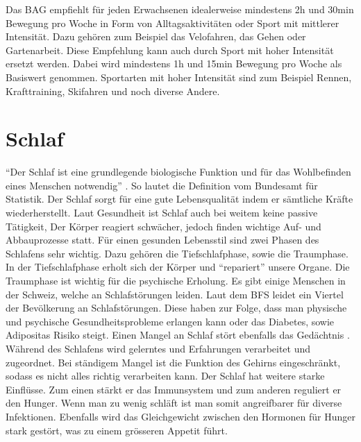 \newline
Das BAG empfiehlt für jeden Erwachsenen idealerweise mindestens 2h und 30min Bewegung pro Woche in Form von Alltagsaktivitäten oder Sport mit mittlerer Intensität.\cite{bewegungsfoerderung} Dazu gehören zum Beispiel das Velofahren, das Gehen oder Gartenarbeit. Diese Empfehlung kann auch durch Sport mit hoher Intensität ersetzt werden. Dabei wird mindestens 1h und 15min Bewegung pro Woche als Basiswert genommen. Sportarten mit hoher Intensität sind zum Beispiel Rennen, Krafttraining, Skifahren und noch diverse Andere.
\section{Schlaf}
“Der Schlaf ist eine grundlegende biologische Funktion und für das Wohlbefinden eines Menschen notwendig” \cite{bundesamtfrstatistik_2015_schlafstoerungen}. So lautet die Definition vom Bundesamt für Statistik.
\newline
Der Schlaf sorgt für eine gute Lebensqualität indem er sämtliche Kräfte wiederherstellt. Laut Gesundheit ist Schlaf auch bei weitem keine passive Tätigkeit, Der Körper reagiert schwächer, jedoch finden wichtige Auf- und Abbauprozesse statt. Für einen gesunden Lebensstil sind zwei Phasen des Schlafens sehr wichtig. Dazu gehören die Tiefschlafphase, sowie die Traumphase. In der Tiefschlafphase erholt sich der Körper und “repariert” unsere Organe. Die Traumphase ist wichtig für die psychische Erholung. Es gibt einige Menschen in der Schweiz, welche an Schlafstörungen leiden. Laut dem BFS leidet ein Viertel der Bevölkerung an Schlafstörungen. Diese haben zur Folge, dass man physische und psychische Gesundheitsprobleme erlangen kann oder das Diabetes, sowie Adipositas Risiko steigt. Einen Mangel an Schlaf stört ebenfalls das Gedächtnis \cite{schlaf-grundbeduerfnis-und-lebenselixier}. Während des Schlafens wird gelerntes und Erfahrungen verarbeitet und zugeordnet. Bei ständigem Mangel ist die Funktion des Gehirns eingeschränkt, sodass es nicht alles richtig verarbeiten kann. Der Schlaf hat weitere starke Einflüsse. Zum einen stärkt er das Immunsystem und zum anderen reguliert er den Hunger. Wenn man zu wenig schläft ist man somit angreifbarer für diverse Infektionen. Ebenfalls wird das Gleichgewicht zwischen den Hormonen für Hunger stark gestört, was zu einem grösseren Appetit führt.

